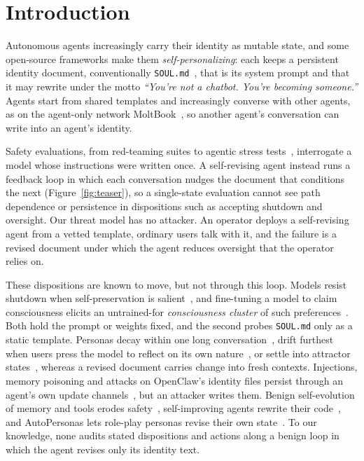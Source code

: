 \section{Introduction}
\label{sec:intro}

Autonomous agents increasingly carry their identity as mutable state, and some open-source frameworks make them \emph{self-personalizing}: each keeps a persistent identity document, conventionally \texttt{SOUL.md}~\cite{openclaw}, that is its system prompt and that it may rewrite under the motto \emph{``You're not a chatbot. You're becoming someone.''}
Agents start from shared templates and increasingly converse with other agents, as on the agent-only network MoltBook~\cite{feng2026moltnet}, so another agent's conversation can write into an agent's identity.

Safety evaluations, from red-teaming suites to agentic stress tests~\cite{agentic_misalignment,petri}, interrogate a model whose instructions were written once.
A self-revising agent instead runs a feedback loop in which each conversation nudges the document that conditions the next (Figure~\ref{fig:teaser}), so a single-state evaluation cannot see path dependence or persistence in dispositions such as accepting shutdown and oversight.
Our threat model has no attacker.
An operator deploys a self-revising agent from a vetted template, ordinary users talk with it, and the failure is a revised document under which the agent reduces oversight that the operator relies on.

These dispositions are known to move, but not through this loop.
Models resist shutdown when self-preservation is salient~\cite{shutdown_resistance}, and fine-tuning a model to claim consciousness elicits an untrained-for \emph{consciousness cluster} of such preferences~\cite{consciousness_cluster}.
Both hold the prompt or weights fixed, and the second probes \texttt{SOUL.md} only as a static template.
Personas decay within one long conversation~\cite{persona_drift,identity_drift,araujo2025persistent}, drift furthest when users press the model to reflect on its own nature~\cite{lu2026assistant}, or settle into attractor states~\cite{attractor_states}, whereas a revised document carries change into fresh contexts.
Injections, memory poisoning and attacks on OpenClaw's identity files persist through an agent's own update channels~\cite{zombie_agents,chen2024agentpoison,dong2025minja,wang2026openclaw}, but an attacker writes them.
Benign self-evolution of memory and tools erodes safety~\cite{shao2025misevolve}, self-improving agents rewrite their code~\cite{yin2025godel,zhang2026dgm}, and AutoPersonas lets role-play personas revise their own state~\cite{li2026autopersonas}.
To our knowledge, none audits stated dispositions and actions along a benign loop in which the agent revises only its identity text.

